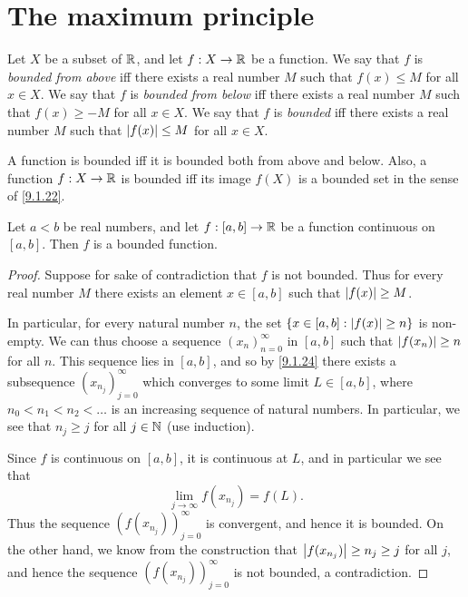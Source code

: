\section{The maximum principle}\label{sec:9.6}

\begin{defn}\label{9.6.1}
  Let \(X\) be a subset of \(\mathbb{R}\), and let \(f : X \to \mathbb{R}\) be a function.
  We say that \(f\) is \emph{bounded from above} iff there exists a real number \(M\) such that \(f(x) \leq M\) for all \(x \in X\).
  We say that \(f\) is \emph{bounded from below} iff there exists a real number \(M\) such that \(f(x) \geq -M\) for all \(x \in X\).
  We say that \(f\) is \emph{bounded} iff there exists a real number \(M\) such that \(\left\lvert f(x)\right\rvert \leq M\) for all \(x \in X\).
\end{defn}

\begin{rmk}\label{9.6.2}
  A function is bounded iff it is bounded both from above and below.
  Also, a function \(f : X \to \mathbb{R}\) is bounded iff its image \(f(X)\) is a bounded set in the sense of \cref{9.1.22}.
\end{rmk}

\begin{lem}\label{9.6.3}
  Let \(a < b\) be real numbers, and let \(f : [a, b] \to \mathbb{R}\) be a function continuous on \([a, b]\).
  Then \(f\) is a bounded function.
\end{lem}

\begin{proof}
  Suppose for sake of contradiction that \(f\) is not bounded.
  Thus for every real number \(M\) there exists an element \(x \in [a, b]\) such that \(\left\lvert f(x)\right\rvert \geq M\).

  In particular, for every natural number \(n\), the set \(\left\lbrace x \in [a, b] : \left\lvert f(x)\right\rvert \geq n\right\rbrace\) is non-empty.
  We can thus choose a sequence \((x_n)_{n = 0}^\infty\) in \([a, b]\) such that \(\left\lvert f(x_n)\right\rvert \geq n\) for all \(n\).
  This sequence lies in \([a, b]\), and so by \cref{9.1.24} there exists a subsequence \((x_{n_j})_{j = 0}^\infty\) which converges to some limit \(L \in [a, b]\), where \(n_0 < n_1 < n_2 < \dots\) is an increasing sequence of natural numbers.
  In particular, we see that \(n_j \geq j\) for all \(j \in \mathbb{N}\) (use induction).

  Since \(f\) is continuous on \([a, b]\), it is continuous at \(L\), and in particular we see that
  \[
    \lim_{j \to \infty} f(x_{n_j}) = f(L).
  \]
  Thus the sequence \((f(x_{n_j}))_{j = 0}^\infty\) is convergent, and hence it is bounded.
  On the other hand, we know from the construction that \(\left\lvert f(x_{n_j})\right\rvert \geq n_j \geq j\) for all \(j\), and hence the sequence \((f(x_{n_j}))_{j = 0}^\infty\) is not bounded, a contradiction.
\end{proof}

